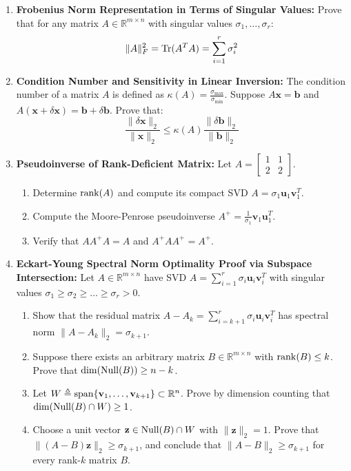 \begin{enumerate}[label=\textbf{P\arabic*.}]
    \item \textbf{Frobenius Norm Representation in Terms of Singular Values:}
    Prove that for any matrix $A \in \mathbb{R}^{m \times n}$ with singular values $\sigma_1, \dots, \sigma_r$:
    \begin{equation}
    \|A\|_F^2 = \operatorname{Tr}(A^T A) = \sum_{i=1}^r \sigma_i^2
    \end{equation}

    \item \textbf{Condition Number and Sensitivity in Linear Inversion:}
    The condition number of a matrix $A$ is defined as $\kappa(A) = \frac{\sigma_{\max}}{\sigma_{\min}}$.
    Suppose $A\mathbf{x} = \mathbf{b}$ and $A(\mathbf{x} + \delta \mathbf{x}) = \mathbf{b} + \delta \mathbf{b}$. Prove that:
    \begin{equation}
    \frac{\|\delta \mathbf{x}\|_2}{\|\mathbf{x}\|_2} \le \kappa(A) \frac{\|\delta \mathbf{b}\|_2}{\|\mathbf{b}\|_2}
    \end{equation}

    \item \textbf{Pseudoinverse of Rank-Deficient Matrix:}
    Let $A = \begin{bmatrix} 1 & 1 \\ 2 & 2 \end{bmatrix}$.
    \begin{enumerate}[label=(\alph*)]
        \item Determine $\operatorname{rank}(A)$ and compute its compact SVD $A = \sigma_1 \mathbf{u}_1 \mathbf{v}_1^T$.
        \item Compute the Moore-Penrose pseudoinverse $A^+ = \frac{1}{\sigma_1} \mathbf{v}_1 \mathbf{u}_1^T$.
        \item Verify that $A A^+ A = A$ and $A^+ A A^+ = A^+$.
    \end{enumerate}

    \item \textbf{Eckart-Young Spectral Norm Optimality Proof via Subspace Intersection:}
    Let $A \in \mathbb{R}^{m \times n}$ have SVD $A = \sum_{i=1}^r \sigma_i \mathbf{u}_i \mathbf{v}_i^T$ with singular values $\sigma_1 \ge \sigma_2 \ge \dots \ge \sigma_r > 0$.
    \begin{enumerate}[label=(\alph*)]
        \item Show that the residual matrix $A - A_k = \sum_{i=k+1}^r \sigma_i \mathbf{u}_i \mathbf{v}_i^T$ has spectral norm $\|A - A_k\|_2 = \sigma_{k+1}$.
        \item Suppose there exists an arbitrary matrix $B \in \mathbb{R}^{m \times n}$ with $\operatorname{rank}(B) \le k$. Prove that $\dim(\operatorname{Null}(B)) \ge n - k$.
        \item Let $W \triangleq \operatorname{span}\{\mathbf{v}_1, \dots, \mathbf{v}_{k+1}\} \subset \mathbb{R}^n$. Prove by dimension counting that $\dim(\operatorname{Null}(B) \cap W) \ge 1$.
        \item Choose a unit vector $\mathbf{z} \in \operatorname{Null}(B) \cap W$ with $\|\mathbf{z}\|_2 = 1$. Prove that $\|(A - B)\mathbf{z}\|_2 \ge \sigma_{k+1}$, and conclude that $\|A - B\|_2 \ge \sigma_{k+1}$ for every rank-$k$ matrix $B$.
    \end{enumerate}


\end{enumerate}
